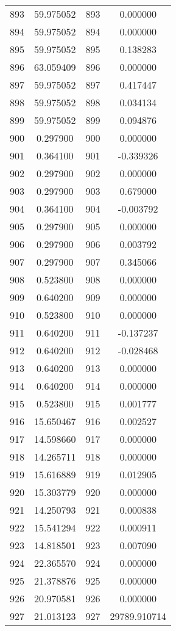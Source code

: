 \documentclass[12pt]{article}
\begin{document}
\begin{longtable}{@{}cccc@{}}
893 & 59.975052 & 893 & 0.000000 \\
894 & 59.975052 & 894 & 0.000000 \\
895 & 59.975052 & 895 & 0.138283 \\
896 & 63.059409 & 896 & 0.000000 \\
897 & 59.975052 & 897 & 0.417447 \\
898 & 59.975052 & 898 & 0.034134 \\
899 & 59.975052 & 899 & 0.094876 \\
900 & 0.297900 & 900 & 0.000000 \\
901 & 0.364100 & 901 & -0.339326 \\
902 & 0.297900 & 902 & 0.000000 \\
903 & 0.297900 & 903 & 0.679000 \\
904 & 0.364100 & 904 & -0.003792 \\
905 & 0.297900 & 905 & 0.000000 \\
906 & 0.297900 & 906 & 0.003792 \\
907 & 0.297900 & 907 & 0.345066 \\
908 & 0.523800 & 908 & 0.000000 \\
909 & 0.640200 & 909 & 0.000000 \\
910 & 0.523800 & 910 & 0.000000 \\
911 & 0.640200 & 911 & -0.137237 \\
912 & 0.640200 & 912 & -0.028468 \\
913 & 0.640200 & 913 & 0.000000 \\
914 & 0.640200 & 914 & 0.000000 \\
915 & 0.523800 & 915 & 0.001777 \\
916 & 15.650467 & 916 & 0.002527 \\
917 & 14.598660 & 917 & 0.000000 \\
918 & 14.265711 & 918 & 0.000000 \\
919 & 15.616889 & 919 & 0.012905 \\
920 & 15.303779 & 920 & 0.000000 \\
921 & 14.250793 & 921 & 0.000838 \\
922 & 15.541294 & 922 & 0.000911 \\
923 & 14.818501 & 923 & 0.007090 \\
924 & 22.365570 & 924 & 0.000000 \\
925 & 21.378876 & 925 & 0.000000 \\
926 & 20.970581 & 926 & 0.000000 \\
927 & 21.013123 & 927 & 29789.910714 \\

\end{longtable}
\end{document}
